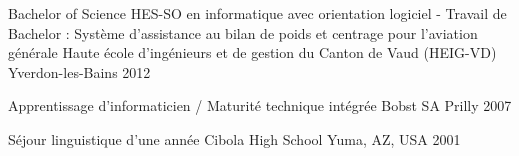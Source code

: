 


\begin{cventries}


\cventry
{Bachelor of Science HES-SO en informatique avec orientation logiciel - Travail de Bachelor : Système d'assistance au bilan de poids et centrage pour l'aviation générale} %
{Haute école d'ingénieurs et de gestion du Canton de Vaud (HEIG-VD)} %
{Yverdon-les-Bains} %
{2012} %
 { %
 }


\cventry
{Apprentissage d'informaticien / Maturité technique intégrée} %
{Bobst SA} %
{Prilly} %
{2007} %
 { %
 }


\cventry
{Séjour linguistique d'une année} %
{Cibola High School} %
{Yuma, AZ, USA} %
{2001} %
 { %
 }


\end{cventries}
